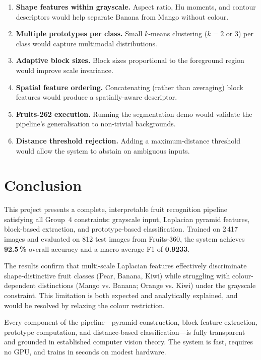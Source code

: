 \documentclass[11pt,a4paper]{article}
\begin{document}
\begin{enumerate}
  \item \textbf{Shape features within grayscale.}  Aspect ratio, Hu moments,
    and contour descriptors would help separate Banana from Mango without
    colour.
  \item \textbf{Multiple prototypes per class.}  Small $k$-means clustering
    ($k = 2$ or $3$) per class would capture multimodal distributions.
  \item \textbf{Adaptive block sizes.}  Block sizes proportional to the
    foreground region would improve scale invariance.
  \item \textbf{Spatial feature ordering.}  Concatenating (rather than
    averaging) block features would produce a spatially-aware descriptor.
  \item \textbf{Fruits-262 execution.}  Running the segmentation demo would
    validate the pipeline's generalisation to non-trivial backgrounds.
  \item \textbf{Distance threshold rejection.}  Adding a maximum-distance
    threshold would allow the system to abstain on ambiguous inputs.
\end{enumerate}

\section{Conclusion}

This project presents a complete, interpretable fruit recognition pipeline
satisfying all Group~4 constraints: grayscale input, Laplacian pyramid
features, block-based extraction, and prototype-based classification.  Trained
on 2\,417 images and evaluated on 812 test images from Fruits-360, the system
achieves \textbf{92.5\,\%} overall accuracy and a macro-average F1 of
\textbf{0.9233}.

The results confirm that multi-scale Laplacian features effectively discriminate
shape-distinctive fruit classes (Pear, Banana, Kiwi) while struggling with
colour-dependent distinctions (Mango vs. Banana; Orange vs. Kiwi) under the
grayscale constraint.  This limitation is both expected and analytically
explained, and would be resolved by relaxing the colour restriction.

Every component of the pipeline---pyramid construction, block feature
extraction, prototype computation, and distance-based classification---is
fully transparent and grounded in established computer vision theory.  The
system is fast, requires no GPU, and trains in seconds on modest hardware.



\end{document}
